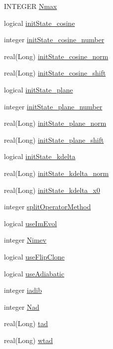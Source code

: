 \begin{DoxyCompactItemize}
INTEGER \hyperlink{namespaceinput__parameters_a29545f09a06c5a3def5df7fdb5f966ab}{Nmax}
\item 
logical \hyperlink{namespaceinput__parameters_a794b8486b7ecd6258448887bce533681}{initState\_\-cosine}
\item 
integer \hyperlink{namespaceinput__parameters_ad5ff3d9c110be99ed08bbe970f1630c8}{initState\_\-cosine\_\-number}
\item 
real(Long) \hyperlink{namespaceinput__parameters_a51d2cc916f531fadef1a6f0729644174}{initState\_\-cosine\_\-norm}
\item 
real(Long) \hyperlink{namespaceinput__parameters_ac3a5530df841dc82b4819f34f1e44980}{initState\_\-cosine\_\-shift}
\item 
logical \hyperlink{namespaceinput__parameters_a727a13be305b5dde7955fd2d02f955e4}{initState\_\-plane}
\item 
integer \hyperlink{namespaceinput__parameters_a876ac6edc93b733aeb66f54aca167741}{initState\_\-plane\_\-number}
\item 
real(Long) \hyperlink{namespaceinput__parameters_a22ba3f1343580a0db34433e32279e365}{initState\_\-plane\_\-norm}
\item 
real(Long) \hyperlink{namespaceinput__parameters_a97253a3c66d919b8a99dd33c633d3bd8}{initState\_\-plane\_\-shift}
\item 
logical \hyperlink{namespaceinput__parameters_aae45dd03716b9ad9a0600a9d9a798935}{initState\_\-kdelta}
\item 
real(Long) \hyperlink{namespaceinput__parameters_a1b2e5c088ab1d39d896586d7fb18b142}{initState\_\-kdelta\_\-norm}
\item 
real(Long) \hyperlink{namespaceinput__parameters_a65eb9165c6a1fd054daefc2a96e7ae2a}{initState\_\-kdelta\_\-x0}
\item 
integer \hyperlink{namespaceinput__parameters_a127f71f45eade1f05ced1535e88c771d}{splitOperatorMethod}
\item 
logical \hyperlink{namespaceinput__parameters_a9672a1c90e65a2ecee350dd2dae64e03}{useImEvol}
\item 
integer \hyperlink{namespaceinput__parameters_ac0212885e38ab22a77411b20bec16420}{Nimev}
\item 
logical \hyperlink{namespaceinput__parameters_a504b6e2c93e4a4af47125d83d6e5d75d}{useFlipClone}
\item 
logical \hyperlink{namespaceinput__parameters_ac1165234d614ad278effaf2a7910888b}{useAdiabatic}
\item 
integer \hyperlink{namespaceinput__parameters_a2b1e4d8baaa62168d989002cf747b30b}{iadib}
\item 
integer \hyperlink{namespaceinput__parameters_a6e8306262594749651ff9230cb525363}{Nad}
\item 
real(Long) \hyperlink{namespaceinput__parameters_ab3ac3c45168fc6aafd02e70822154417}{tad}
\item 
real(Long) \hyperlink{namespaceinput__parameters_a8d452c8a3d45ee77279fc26867c74ed6}{wtad}
\end{DoxyCompactItemize}


